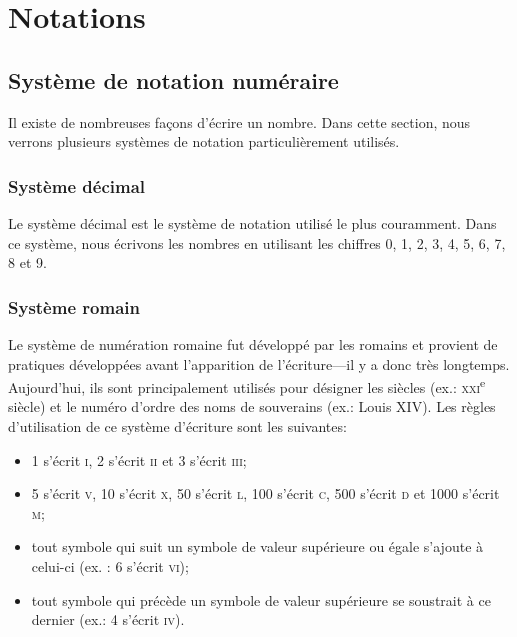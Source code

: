 \chapter{Notations}

\section{Système de notation numéraire}

Il existe de nombreuses façons d'écrire un nombre. Dans cette section, nous verrons plusieurs systèmes de notation particulièrement utilisés.

\subsection{Système décimal}

Le système décimal est le système de notation utilisé le plus couramment. Dans ce système, nous écrivons les nombres en utilisant les chiffres 0, 1, 2, 3, 4, 5, 6, 7, 8 et 9.



\subsection{Système romain}

Le système de numération romaine fut développé par les romains et provient de pratiques développées avant l'apparition de l'écriture---il y a donc très longtemps. Aujourd'hui, ils sont principalement utilisés pour désigner les siècles (ex.: \textsc{xxi}\textsuperscript{e} siècle) et le numéro d'ordre des noms de souverains (ex.: Louis XIV). Les règles d'utilisation de ce système d'écriture sont les suivantes:
\begin{itemize}
	\item 1 s'écrit \textsc{i}, 2 s'écrit \textsc{ii} et 3 s'écrit \textsc{iii};
	\item 5 s'écrit \textsc{v}, 10 s'écrit \textsc{x}, 50 s'écrit \textsc{l}, 100 s'écrit \textsc{c}, 500 s'écrit \textsc{d} et 1000 s'écrit \textsc{m};
	\item tout symbole qui suit un symbole de valeur supérieure ou égale s'ajoute à celui-ci (ex. : 6 s'écrit \textsc{vi});
	\item tout symbole qui précède un symbole de valeur supérieure se soustrait à ce dernier (ex.: 4 s'écrit \textsc{iv}).
\end{itemize}

